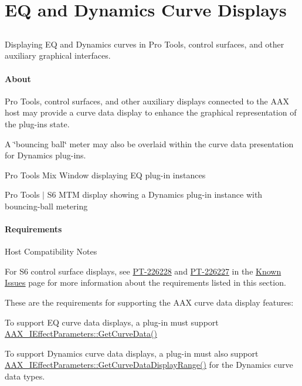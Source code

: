\hypertarget{a00342}{}\section{E\+Q and Dynamics Curve Displays}
\label{a00342}


\subsection{ }
Displaying E\+Q and Dynamics curves in Pro Tools, control surfaces, and other auxiliary graphical interfaces. 

\paragraph*{About}

 Pro Tools, control surfaces, and other auxiliary displays connected to the A\+A\+X host may provide a curve data display to enhance the graphical representation of the plug-\/in\textquotesingle{}s state.

 A \char`\"{}bouncing ball\char`\"{} meter may also be overlaid within the curve data presentation for Dynamics plug-\/ins.

  Pro Tools Mix Window displaying E\+Q plug-\/in instances

  Pro Tools $\vert$ S6 M\+T\+M display showing a Dynamics plug-\/in instance with bouncing-\/ball metering



\paragraph*{Requirements}

 \begin{DoxyRefDesc}{Host Compatibility Notes}
\item[\hyperlink{a00380__compatibility_notes000001}{Host Compatibility Notes}]For S6 control surface displays, see \hyperlink{a00374_PT-226228}{P\+T-\/226228} and \hyperlink{a00374_PT-226227}{P\+T-\/226227} in the \hyperlink{a00374}{Known Issues} page for more information about the requirements listed in this section.\end{DoxyRefDesc}


 These are the requirements for supporting the A\+A\+X curve data display features\+:


\begin{DoxyItemize}
\item To support E\+Q curve data displays, a plug-\/in must support \hyperlink{a00342_gaa85bda4027342eb644a9c92a17da6d49}{A\+A\+X\+\_\+\+I\+Effect\+Parameters\+::\+Get\+Curve\+Data()}
\item To support Dynamics curve data displays, a plug-\/in must also support \hyperlink{a00342_ga38d1ac0c15a7052904077ef0e2527e0d}{A\+A\+X\+\_\+\+I\+Effect\+Parameters\+::\+Get\+Curve\+Data\+Display\+Range()} for the Dynamics curve data types.
\end{DoxyItemize}

